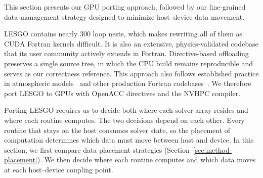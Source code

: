 This section presents our GPU porting approach, followed by our 
fine-grained data-management strategy designed to minimize 
host--device data movement.

LESGO contains nearly 300 loop nests, which makes rewriting all of
them as CUDA Fortran kernels difficult. It is also an extensive,
physics-validated codebase that its user community actively extends in
Fortran. Directive-based offloading preserves a single source tree, in
which the CPU build remains reproducible and serves as our correctness
reference. This approach also follows established practice in
atmospheric models~\cite{esclapez2025dales,lapillonne2014,govett2017nim}
and other production Fortran codebases~\cite{otero2019nek,caplan2019mas}.
We therefore port LESGO to GPUs with OpenACC directives and the NVHPC
compiler.

Porting LESGO requires us to decide both where each solver array
resides and where each routine computes. The two decisions depend on
each other. Every routine that stays on the host consumes solver state,
so the placement of computation determines which data must move between
host and device. In this section, we first compare data placement
strategies (Section~\ref{sec:method-placement}). We then decide where
each routine computes and which data moves at each host--device
coupling point.


